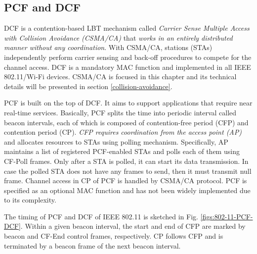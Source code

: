 \subsection{PCF and DCF}
\label{pcf-dcf}

DCF is a contention-based LBT mechanism called \textit{Carrier Sense Multiple Access with Collision Avoidance (CSMA/CA)} that \textit{works in an entirely distributed manner without any coordination}. With CSMA/CA, stations (STAs) independently perform carrier sensing and back-off procedures to compete for the channel access. DCF is a mandatory MAC function and implemented in all IEEE 802.11/Wi-Fi devices. CSMA/CA is focused in this chapter and its technical details will be presented in section \ref{collision-avoidance}.

PCF is built on the top of DCF. It aims to support applications that require near real-time services. Basically, PCF splits the time into periodic interval called beacon intervals, each of which is composed of contention-free period (CFP) and contention period (CP). \textit{CFP requires coordination from the access point (AP)} and allocates resources to STAs using polling mechanism. Specifically, AP maintains a list of registered PCF-enabled STAs and polls each of them using CF-Poll frames. Only after a STA is polled, it can start its data transmission. In case the polled STA does not have any frames to send, then it must transmit null frame. Channel access in CP of PCF is handled by CSMA/CA protocol. PCF is specified as an optional MAC function and has not been widely implemented due to its complexity.

The timing of PCF and DCF of IEEE 802.11 is sketched in Fig. \ref{figs:802-11-PCF-DCF}. Within a given beacon interval, the start and end of CFP are marked by beacon and CF-End control frames, respectively. CP follows CFP and is terminated by a beacon frame of the next beacon interval. 


